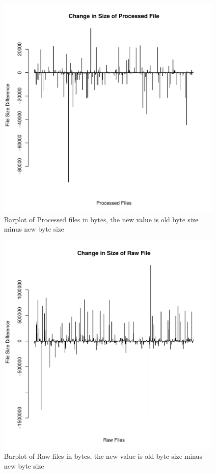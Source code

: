 \documentclass[letterpaper,11pt]{article}
\begin{document}
 \begin{figure}[h]
 \centering
 \includegraphics[scale=0.8]{ProcessedHistogram.pdf}
 \caption{Barplot of Processed files in bytes, the new value is old byte size minus new byte size}
 \label{fig:q3split3}
 \end{figure}
 
  \begin{figure}[h]
 \centering
 \includegraphics[scale=0.8]{RawHistogram.pdf}
 \caption{Barplot of Raw files in bytes, the new value is old byte size minus new byte size}
 \label{fig:q3split4}
 \end{figure}
\end{document}
